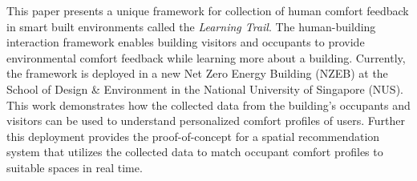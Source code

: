

This paper presents a unique framework for collection of human comfort feedback in smart built environments called the \emph{Learning Trail}. The human-building interaction framework enables building visitors and occupants to provide environmental comfort feedback while learning more about a building. Currently, the framework is deployed in a new Net Zero Energy Building (NZEB) at the School of Design \& Environment in the National University of Singapore (NUS). This work demonstrates how the collected data from the building's occupants and visitors can be used to understand personalized comfort profiles of users. Further this deployment provides the proof-of-concept for a spatial recommendation system that utilizes the collected data to match occupant comfort profiles to suitable spaces in real time.



